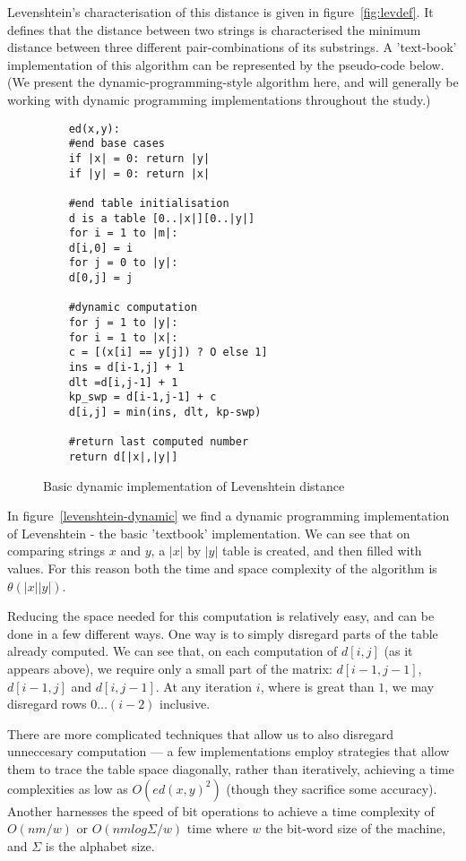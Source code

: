 Levenshtein's characterisation of this distance is given in
figure~\ref{fig:levdef}. It defines that the distance between two
strings is characterised the minimum distance between three different
pair-combinations of its substrings. A 'text-book' implementation of
this algorithm can be represented by the pseudo-code below. (We
present the dynamic-programming-style algorithm here, and will
generally be working with dynamic programming implementations
throughout the study.)

\begin{figure}
  \centering
  \begin{lstlisting}
    ed(x,y):
    #end base cases
    if |x| = 0: return |y|
    if |y| = 0: return |x|    

    #end table initialisation
    d is a table [0..|x|][0..|y|]
    for i = 1 to |m|:
    d[i,0] = i
    for j = 0 to |y|:
    d[0,j] = j           
    
    #dynamic computation
    for j = 1 to |y|:
    for i = 1 to |x|:
    c = [(x[i] == y[j]) ? O else 1]
    ins = d[i-1,j] + 1
    dlt =d[i,j-1] + 1
    kp_swp = d[i-1,j-1] + c
    d[i,j] = min(ins, dlt, kp-swp)
    
    #return last computed number
    return d[|x|,|y|]
  \end{lstlisting}
  \caption{Basic dynamic implementation of Levenshtein distance}
  \label{fig:levenshtein-dynamic}
\end{figure}

In figure~\ref{levenshtein-dynamic} we find a dynamic programming
implementation of Levenshtein - the basic 'textbook'
implementation. We can see that on comparing strings $x$ and $y$, a
$|x|$ by $|y|$ table is created, and then filled with values. For this
reason both the time and space complexity of the algorithm is $\theta
(|x||y|)$.

Reducing the space needed for this computation is relatively easy, and
can be done in a few different ways. One way is to simply disregard
parts of the table already computed. We can see that, on each
computation of $d[i,j]$ (as it appears above), we require only a small
part of the matrix: $d[i-1,j-1]$, $d[i-1,j]$ and $d[i,j-1]$. At any
iteration $i$, where is great than $1$, we may disregard rows $0 \dots
(i-2)$ inclusive.

There are more complicated techniques that allow us to also disregard
unneccesary computation --- a few implementations employ strategies
that allow them to trace the table space diagonally, rather than
iteratively, achieving a time complexities as low as $O(ed(x, y)^2)$
(though they sacrifice some accuracy).\cite{Chang1992} Another
harnesses the speed of bit operations to achieve a time complexity of
$O(nm/w)$ or $O(nm log {\Sigma}/w)$ time where $w$ the bit-word size
of the machine, and $\Sigma$ is the alphabet
size.\cite{Myers1999}\cite{Hyyro2003}

